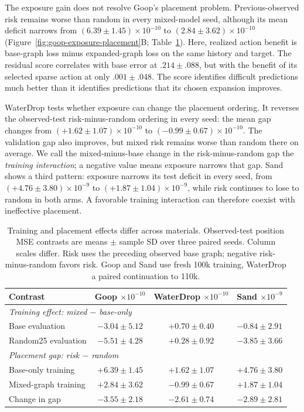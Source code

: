 The exposure gain does not resolve Goop's placement problem. Previous-observed risk remains worse than random in every mixed-model seed, although its mean deficit narrows from $(6.39\pm1.45)\times10^{-10}$ to $(2.84\pm3.62)\times10^{-10}$ (Figure~\ref{fig:goop-exposure-placement}B; Table~\ref{tab:goop-exposure-placement}). Here, realized action benefit is base-graph loss minus expanded-graph loss on the same history and target. The residual score correlates with base error at $.214\pm.088$, but with the benefit of its selected sparse action at only $.001\pm.048$. The score identifies difficult predictions much better than it identifies predictions that its chosen expansion improves.

WaterDrop tests whether exposure can change the placement ordering. It reverses the observed-test risk-minus-random ordering in every seed: the mean gap changes from $(+1.62\pm1.07)\times10^{-10}$ to $(-0.99\pm0.67)\times10^{-10}$. The validation gap also improves, but mixed risk remains worse than random there on average. We call the mixed-minus-base change in the risk-minus-random gap the \emph{training interaction}; a negative value means exposure narrows that gap. Sand shows a third pattern: exposure narrows its test deficit in every seed, from $(+4.76\pm3.80)\times10^{-9}$ to $(+1.87\pm1.04)\times10^{-9}$, while risk continues to lose to random in both arms. A favorable training interaction can therefore coexist with ineffective placement.

\begin{table}[t]
\centering\scriptsize
\caption{Training and placement effects differ across materials. Observed-test position MSE contrasts are means $\pm$ sample SD over three paired seeds. Column scales differ. Risk uses the preceding observed base graph; negative risk-minus-random favors risk. Goop and Sand use fresh 100k training, WaterDrop a paired continuation to 110k.}
\label{tab:goop-exposure-placement}
\setlength{\tabcolsep}{2.5pt}
\renewcommand{\arraystretch}{1.1}
\begin{tabular}{lccc}
\toprule
Contrast & \shortstack{Goop\\$\times10^{-10}$} & \shortstack{WaterDrop\\$\times10^{-10}$} & \shortstack{Sand\\$\times10^{-9}$}\\
\midrule
\multicolumn{4}{l}{\textit{Training effect: mixed $-$ base-only}}\\
Base evaluation & $-3.04\pm5.12$ & $+0.70\pm0.40$ & $-0.84\pm2.91$\\
Random25 evaluation & $-5.51\pm4.28$ & $+0.28\pm0.92$ & $-3.85\pm3.66$\\
\midrule
\multicolumn{4}{l}{\textit{Placement gap: risk $-$ random}}\\
Base-only training & $+6.39\pm1.45$ & $+1.62\pm1.07$ & $+4.76\pm3.80$\\
Mixed-graph training & $+2.84\pm3.62$ & $-0.99\pm0.67$ & $+1.87\pm1.04$\\
Change in gap & $-3.55\pm2.18$ & $-2.61\pm0.74$ & $-2.89\pm2.81$\\
\bottomrule
\end{tabular}
\end{table}


